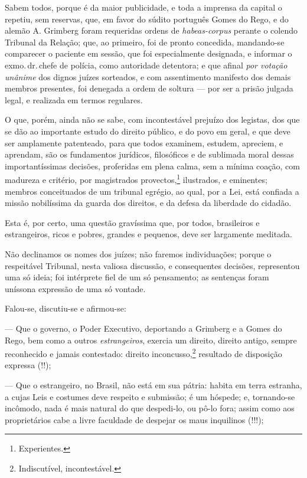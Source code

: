 {
Sabem todos, porque é da maior publicidade, e toda a imprensa da capital
o repetiu, sem reservas, que, em favor do súdito português Gomes do
Rego, e do alemão A. Grimberg foram requeridas ordens de
\emph{habeas-corpus} perante o colendo Tribunal da Relação; que, ao
primeiro, foi de pronto concedida, mandando-se comparecer o paciente em
sessão, que foi especialmente designada, e informar o exmo.\,dr.\,chefe de
polícia, como autoridade detentora; e que afinal \emph{por votação
unânime} dos dignos juízes sorteados, e com assentimento manifesto dos
demais membros presentes, foi denegada a ordem de soltura --- por ser a
prisão julgada legal, e realizada em termos regulares.

O que, porém, ainda não se sabe, com incontestável prejuízo dos
legistas, dos que se dão ao importante estudo do direito público, e do
povo em geral, e que deve ser amplamente patenteado, para que todos
examinem, estudem, apreciem, e aprendam, são os fundamentos jurídicos,
filosóficos e de sublimada moral dessas importantíssimas decisões,
proferidas em plena calma, sem a mínima coação, com madureza e critério,
por magistrados provectos,\footnote{Experientes.} ilustrados, e
eminentes; membros conceituados de um tribunal egrégio, ao qual, por a
Lei, está confiada a missão nobilíssima da guarda dos direitos, e da
defesa da liberdade do cidadão.

Esta é, por certo, uma questão gravíssima que, por todos, brasileiros e
estrangeiros, ricos e pobres, grandes e pequenos, deve ser largamente
meditada.

Não declinamos os nomes dos juízes; não faremos individuações; porque o
respeitável Tribunal, nesta valiosa discussão, e consequentes decisões,
representou uma só ideia; foi intérprete fiel de um só pensamento; as
sentenças foram uníssona expressão de uma só vontade.

Falou-se, discutiu-se e afirmou-se:

--- Que o governo, o Poder Executivo, deportando a Grimberg e a Gomes
  do Rego, bem como a outros \emph{estrangeiros}, exercia um direito,
  direito antigo, sempre reconhecido e jamais contestado: direito
  inconcusso,\footnote{Indiscutível, incontestável.} resultado de
  disposição expressa (!!);

--- Que o estrangeiro, no Brasil, não está em sua pátria: habita em
  terra estranha, a cujas Leis e costumes deve respeito e submissão; é
  um hóspede; e, tornando-se incômodo, nada é mais natural do que
  despedi-lo, ou pô-lo fora; assim como aos proprietários cabe a livre
  faculdade de despejar os maus inquilinos (!!!);

}

